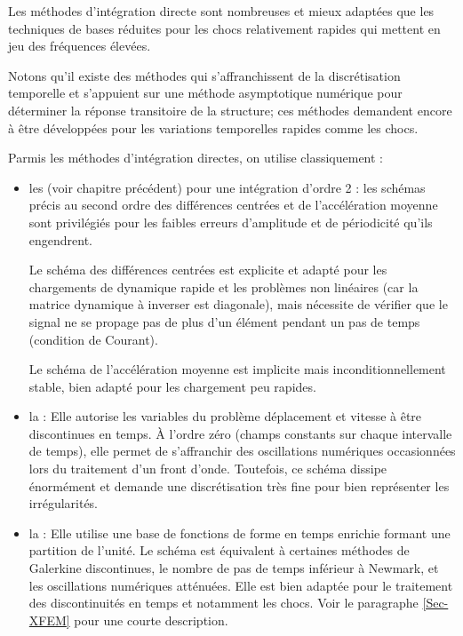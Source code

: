 Les méthodes d'intégration directe sont nombreuses et mieux adaptées que les
techniques de bases réduites pour les chocs relativement rapides qui mettent en jeu des
fréquences élevées.

Notons qu'il existe des méthodes qui s'affranchissent de la discrétisation temporelle et
s'appuient sur une méthode asymptotique numérique pour déterminer la réponse
transitoire de la structure; ces méthodes demandent encore à être
développées pour les variations temporelles rapides comme les chocs.

Parmis les méthodes d'intégration directes, on utilise classiquement :
\begin{itemize}
	\item les  (voir chapitre précédent) pour une intégration d'ordre 2 :
		les schémas précis au second ordre des différences centrées et de
		l'accélération moyenne sont privilégiés pour les faibles erreurs d'amplitude
		et de périodicité qu'ils engendrent.
		
		Le schéma des différences centrées
		est explicite et adapté pour les chargements de dynamique rapide et les
		problèmes non linéaires (car la matrice dynamique à inverser est diagonale),
		mais nécessite de vérifier que le signal ne se propage pas de plus d'un élément
		pendant un pas de temps (condition de Courant).
		
		Le schéma de l'accélération moyenne est implicite mais inconditionnellement
		stable, bien adapté pour les chargement peu rapides.
	\item la :
		Elle autorise les variables du problème déplacement et vitesse à être
		discontinues en temps.
		À l'ordre zéro (champs constants sur chaque intervalle de temps), elle permet
		de s'affranchir des oscillations numériques occasionnées lors du traitement
		d'un front d'onde.
		Toutefois, ce schéma dissipe énormément et demande une discrétisation
		très fine pour bien représenter les irrégularités.
	\item la :
		Elle utilise une base de fonctions de forme en temps enrichie formant une partition de l'unité.
		Le schéma est équivalent à certaines méthodes de Galerkine discontinues, le nombre de
		pas de temps inférieur à Newmark, et les oscillations numériques atténuées.
		Elle est bien adaptée pour le traitement des discontinuités en temps et
		notamment les chocs. Voir le paragraphe \ref{Sec-XFEM} pour une courte description.
\end{itemize}

